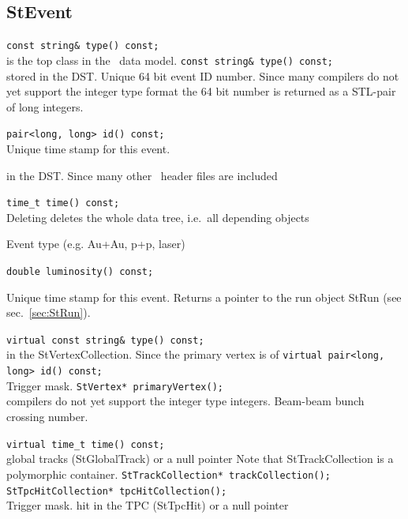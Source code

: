 %
\subsection{StEvent}
\label{sec:StEvent}
    \verb+const string& type() const;+\\
     is the top class in the \StEvent\ data model.
    \verb+const string& type() const;+\\ 
    stored in the DST.
    Unique 64 bit event ID number. Since many
    compilers do not yet support the 
    integer type format the 64 bit number is returned
    as a STL-pair of long integers. 

    \verb+pair<long, long> id() const;+\\
    Unique time stamp for this event.
    
    in the DST. Since many other \StEvent\ header files are included
    
    \verb+time_t time() const;+\\
    Deleting  deletes the whole data tree, i.e.~all depending objects
    
    Event type (e.g. Au+Au, p+p, laser)

    

    \verb+double luminosity() const;+\\      
    
\item[Public\\ Constructors]
     Unique time stamp for this event.
    Returns a pointer to the run object StRun (see sec.~\ref{sec:StRun}).
    
    \verb+virtual const string& type() const;+\\
    
    in the StVertexCollection. Since the primary vertex is of
    \verb+virtual pair<long, long> id() const;+\\
    Trigger mask.
    \verb+StVertex* primaryVertex();+\\
    compilers do not yet support the  integer type
    integers. 
    Beam-beam bunch crossing number.
    
    \verb+virtual time_t time() const;+\\

    
    global tracks (StGlobalTrack) or a null pointer
    Note that StTrackCollection is a polymorphic container.
    \verb+StTrackCollection* trackCollection();+\\
    \verb+StTpcHitCollection* tpcHitCollection();+\\
    Trigger mask.
    hit in the TPC (StTpcHit) or a null pointer

